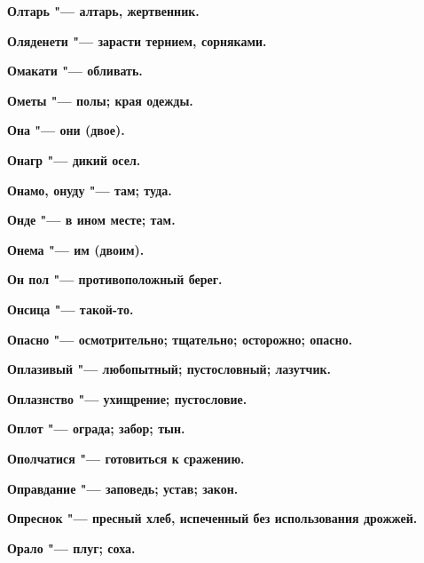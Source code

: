 \begin{mymulticols}{2}
\bfseries Олтарь\normalfont{} "--- алтарь, жертвенник. 




\bfseries Оляденети\normalfont{} "--- зарасти тернием, сорняками. 




\bfseries Омакати\normalfont{} "--- обливать. 




\bfseries Ометы\normalfont{} "--- полы; края одежды. 




\bfseries Она\normalfont{} "--- они (двое). 




\bfseries Онагр\normalfont{} "--- дикий осел. 




\bfseries Онамо, онуду\normalfont{} "--- там; туда. 




\bfseries Онде\normalfont{} "--- в ином месте; там. 




\bfseries Онема\normalfont{} "--- им (двоим). 




\bfseries Он пол\normalfont{} "--- противоположный берег. 




\bfseries Онсица\normalfont{} "--- такой-то. 




\bfseries Опасно\normalfont{} "--- осмотрительно; тщательно; осторожно; опасно. 




\bfseries Оплазивый\normalfont{} "--- любопытный; пустословный; лазутчик. 




\bfseries Оплазнство\normalfont{} "--- ухищрение; пустословие. 




\bfseries Оплот\normalfont{} "--- ограда; забор; тын. 




\bfseries Ополчатися\normalfont{} "--- готовиться к сражению. 




\bfseries Оправдание\normalfont{} "--- заповедь; устав; закон. 




\bfseries Опреснок\normalfont{} "--- пресный хлеб, испеченный без использования дрожжей. 




\bfseries Орало\normalfont{} "--- плуг; соха. 





\end{mymulticols}
